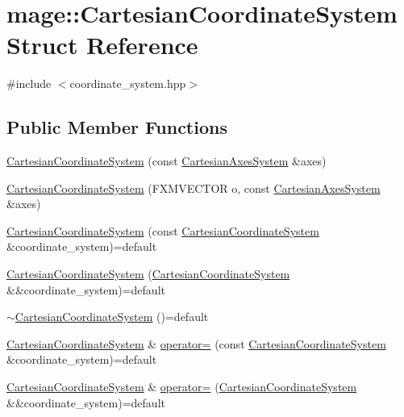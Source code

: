 \hypertarget{structmage_1_1_cartesian_coordinate_system}{}\section{mage\+:\+:Cartesian\+Coordinate\+System Struct Reference}
\label{structmage_1_1_cartesian_coordinate_system}


{\ttfamily \#include $<$coordinate\+\_\+system.\+hpp$>$}

\subsection*{Public Member Functions}
\begin{DoxyCompactItemize}
\item 
\hyperlink{structmage_1_1_cartesian_coordinate_system_a3f4a3309daccc818f06400a44f70b09b}{Cartesian\+Coordinate\+System} (const \hyperlink{structmage_1_1_cartesian_axes_system}{Cartesian\+Axes\+System} \&axes)
\item 
\hyperlink{structmage_1_1_cartesian_coordinate_system_a31a41ba970f47274c05a6b73b57a5f8f}{Cartesian\+Coordinate\+System} (F\+X\+M\+V\+E\+C\+T\+OR o, const \hyperlink{structmage_1_1_cartesian_axes_system}{Cartesian\+Axes\+System} \&axes)
\item 
\hyperlink{structmage_1_1_cartesian_coordinate_system_a1f580b96edaae45356510208c187c1e2}{Cartesian\+Coordinate\+System} (const \hyperlink{structmage_1_1_cartesian_coordinate_system}{Cartesian\+Coordinate\+System} \&coordinate\+\_\+system)=default
\item 
\hyperlink{structmage_1_1_cartesian_coordinate_system_addc5cb01c6b990d1badb067da28e62bc}{Cartesian\+Coordinate\+System} (\hyperlink{structmage_1_1_cartesian_coordinate_system}{Cartesian\+Coordinate\+System} \&\&coordinate\+\_\+system)=default
\item 
\hyperlink{structmage_1_1_cartesian_coordinate_system_a86effcef63e455323c194063c0f1fd46}{$\sim$\+Cartesian\+Coordinate\+System} ()=default
\item 
\hyperlink{structmage_1_1_cartesian_coordinate_system}{Cartesian\+Coordinate\+System} \& \hyperlink{structmage_1_1_cartesian_coordinate_system_acf9dab4edc5c07b5bbf6bee0bdfe317c}{operator=} (const \hyperlink{structmage_1_1_cartesian_coordinate_system}{Cartesian\+Coordinate\+System} \&coordinate\+\_\+system)=default
\item 
\hyperlink{structmage_1_1_cartesian_coordinate_system}{Cartesian\+Coordinate\+System} \& \hyperlink{structmage_1_1_cartesian_coordinate_system_afc51347ff3f42576c483c76f5747c4c6}{operator=} (\hyperlink{structmage_1_1_cartesian_coordinate_system}{Cartesian\+Coordinate\+System} \&\&coordinate\+\_\+system)=default

\end{DoxyCompactItemize}
